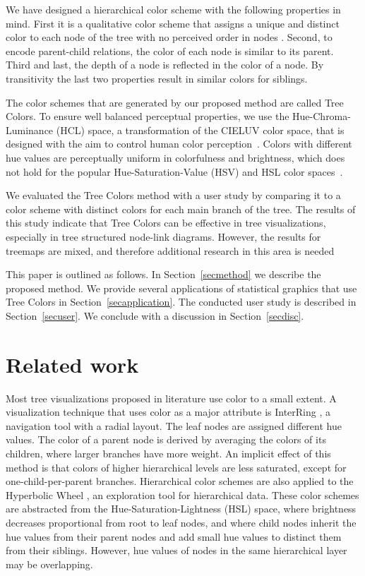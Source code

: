 \documentclass[journal]{vgtc}                %
\begin{document}
We have designed a hierarchical color scheme with the following properties in mind. First it is a qualitative color scheme that assigns a unique and distinct color to each node of the tree with no perceived order in nodes \cite{brewer03, zeileis2009}. Second, to encode parent-child relations, the color of each node is similar to its parent. Third and last, the depth of a node is reflected in the color of a node. By transitivity the last two properties result in similar colors for siblings.

The color schemes that are generated by our proposed method are called Tree Colors. To ensure well
balanced perceptual properties, we use the Hue-Chroma-Luminance (HCL) space, a transformation of the CIELUV color space, that is designed with the aim to control human color perception~\cite{ihaka2003}. Colors with different hue values are perceptually uniform in colorfulness and brightness, which does not hold for the popular Hue-Saturation-Value (HSV) and HSL color spaces~\cite{zeileis2009}.

We evaluated the Tree Colors method with a user study by comparing it to a color scheme with distinct colors for each main branch of the tree. The results of this study indicate
that Tree Colors can be effective in tree visualizations, especially in tree structured node-link diagrams. However, the results for treemaps
are mixed, and therefore additional research in this area is needed

This paper is outlined as follows. In Section~\ref{secmethod} we describe the proposed method. We provide several applications of statistical graphics that use Tree Colors in Section~\ref{secapplication}. The conducted user study is described in Section~\ref{secuser}. We conclude with a discussion in Section~\ref{secdisc}.

\section{Related work}

Most tree visualizations proposed in literature \cite{schulz2011} use color to a small extent. A visualization technique that uses color as a major attribute is InterRing \cite{yang2002}, a navigation tool with a radial layout. The leaf nodes are assigned different hue values. The color of a parent node is derived by averaging the colors of its children, where larger branches have more weight. An implicit effect of this method is that colors of higher hierarchical levels are less saturated, except for one-child-per-parent branches. 
Hierarchical color schemes are also applied to the Hyperbolic Wheel \cite{lam2012}, an exploration tool for hierarchical data.  These color schemes are abstracted from the Hue-Saturation-Lightness (HSL) space, where brightness decreases proportional from root to leaf nodes, and where child nodes inherit the hue values from their parent nodes and add small hue values to distinct them from their siblings. However, hue values of nodes in the same hierarchical layer may be overlapping.
\end{document}
